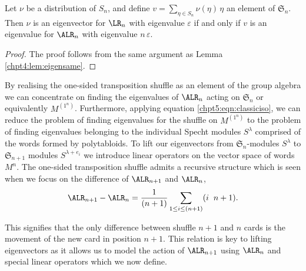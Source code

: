\documentclass[11pt]{report}
\begin{document}
\begin{lemma}
	\label{chpt5:lem:eigensame}
	Let $\nu$ be a distribution of $S_{n}$, and define $v = \sum_{\eta \in S_{n}} \nu(\eta) \, \eta $ an element of $\mathfrak{S}_{n}$. Then 
	$\nu$ is an eigenvector for $\LR_{n}$ with eigenvalue 
	$\varepsilon$ if and only if $v$ is an eigenvalue for $\ALR_{n}$ with 
	eigenvalue $n \, \varepsilon$.
\end{lemma} 
\begin{proof}
	The proof follows from the same argument as Lemma
	\ref{chpt4:lem:eigensame}.
\end{proof}


By realising the one-sided transposition shuffle as an element of the group algebra we 
can 
concentrate on finding the eigenvalues of $\ALR_{n}$ acting on 
$\mathfrak{S}_{n}$ or equivalently $M^{(1^{n})}$. 
Furthermore, applying equation \eqref{chpt5:eqn:classiciso}, we can reduce the problem 
of finding eigenvalues for the shuffle on $M^{(1^n)}$ to the problem of 
finding eigenvalues belonging to the individual Specht modules $S^\lambda$ comprised 
of the words formed by polytabloids. To lift our eigenvectors from 
$\mathfrak{S}_{n}$-modules $S^{\lambda}$ to $\mathfrak{S}_{n+1}$ modules 
$S^{\lambda+ e_{i}}$ we introduce linear operators on the vector 
space of words $M^{n}$. The one-sided transposition shuffle admits a recursive structure which is seen when we focus on the difference of $\ALR_{n+1}$ and $\ALR_{n}$,
\begin{eqnarray}
\ALR_{n+1} - \ALR_{n} = \frac{1}{(n+1)}\sum_{1\leq i \leq (n+1)} (i 
\hspace{0.2cm} n+1). \label{chpt5:eqn:lrdifference}
\end{eqnarray}

This signifies that the only difference between shuffle $n+1$ and $n$ cards is the movement of the new card in position $n+1$. This relation is key to lifting eigenvectors as it allows us to model the action of $\ALR_{n+1}$ using $\ALR_{n}$ and special linear operators which we now define.
\end{document}

